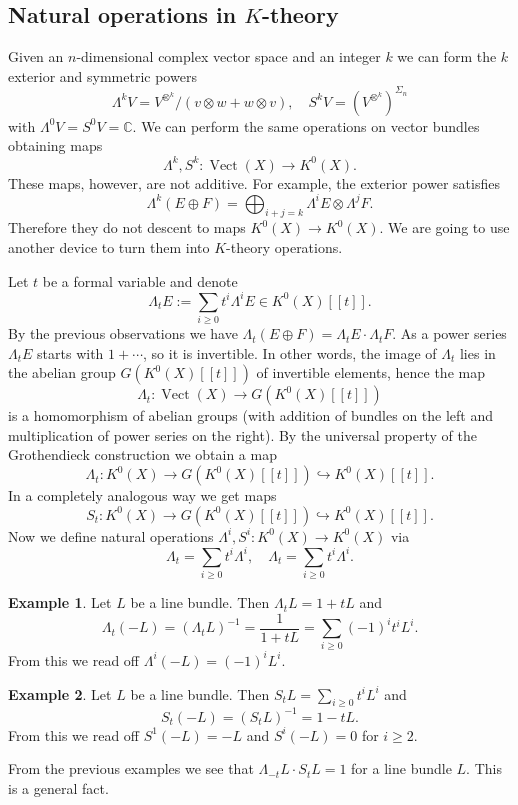 \documentclass[a4paper,10pt]{article}
\theoremstyle{plain}%
\theoremstyle{definition}
\newtheorem{exmp}{Example}
\theoremstyle{remark}
\newcommand{\CC}{\mathbb{C}}
\DeclareMathOperator{\Vect}{Vect}
\begin{document}
\subsection{Natural operations in $K$-theory}

Given an $n$-dimensional complex vector space and an integer $k$ we can form the $k$ exterior and symmetric powers
$$\Lambda^k V=V^{\otimes^k}/(v\otimes w+w\otimes v),\quad S^kV=(V^{\otimes^k})^{\Sigma_n}$$
with $\Lambda^0V=S^0V=\CC$. We can perform the same operations on vector bundles obtaining maps
$$\Lambda^k, S^k:\Vect(X)\to K^0(X).$$
These maps, however, are not additive. For example, the exterior power satisfies
$$\Lambda^k(E\oplus F)=\bigoplus_{i+j=k} \Lambda^i E\otimes \Lambda^j F.$$
Therefore they do not descent to maps $K^0(X)\to K^0(X)$. We are going to use another device to turn them into $K$-theory operations.

Let $t$ be a formal variable and denote
$$\Lambda_t E:=\sum_{i\geq 0} t^i\Lambda^i E\in K^0(X)[[t]].$$
By the previous observations we have $\Lambda_t(E\oplus F)=\Lambda_tE\cdot\Lambda_tF$. As a power series $\Lambda_tE$ starts with $1+\cdots$, so it is invertible. In other words, the image of $\Lambda_t$ lies in the abelian group $G(K^0(X)[[t]])$ of invertible elements, hence the map
$$\Lambda_t:\Vect(X)\to G(K^0(X)[[t]])$$
is a homomorphism of abelian groups (with addition of bundles on the left and multiplication of power series on the right). By the universal property of the Grothendieck construction we obtain a map
$$\Lambda_t:K^0(X)\to G(K^0(X)[[t]])\hookrightarrow K^0(X)[[t]].$$
In a completely analogous way we get maps
$$S_t:K^0(X)\to G(K^0(X)[[t]])\hookrightarrow K^0(X)[[t]].$$
Now we define natural operations $\Lambda^i,S^i:K^0(X)\to K^0(X)$ via
$$\Lambda_t=\sum_{i\geq 0} t^i\Lambda^i,\quad \Lambda_t=\sum_{i\geq 0} t^i\Lambda^i.$$

\begin{exmp}
Let $L$ be a line bundle. Then $\Lambda_tL=1+tL$ and
$$\Lambda_t(-L)=(\Lambda_tL)^{-1}=\frac{1}{1+tL}=\sum_{i\geq 0}(-1)^it^iL^i.$$
From this we read off $\Lambda^i(-L)=(-1)^iL^i$.
\end{exmp}

\begin{exmp}
Let $L$ be a line bundle. Then $S_tL=\sum_{i\geq 0} t^iL^i$ and
$$S_t(-L)=(S_tL)^{-1}=1-tL.$$
From this we read off $S^1(-L)=-L$ and $S^i(-L)=0$ for $i\geq 2$.
\end{exmp}

From the previous examples we see that $\Lambda_{-t}L\cdot S_t L=1$ for a line bundle $L$. This is a general fact.
\end{document}

